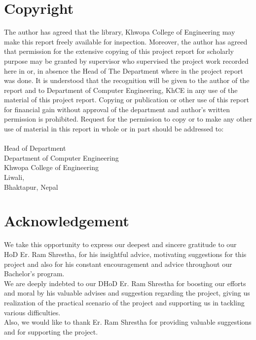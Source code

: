 			\chapter*{Copyright}
		\normalsize
			The author has agreed that the library, Khwopa College of Engineering  may make this report freely available for inspection. Moreover, the author has agreed that permission for the extensive copying of this project report for scholarly purpose may be granted by supervisor who supervised the project work recorded here in or, in absence the Head of The Department where in the project report was done. It is understood that the recognition will be given to the author of the report and to Department of Computer Engineering, KhCE in any use of the material of this project report. Copying or publication or other use of this report for financial gain without approval of the department and author’s written permission is prohibited. Request for the permission to copy or to make any other use of material in this report in whole or in part should be addressed to: \\
			\vspace{1cm} \\
			Head of Department \\
			Department of Computer Engineering\\
			Khwopa College of Engineering\\
			Liwali,\\
			Bhaktapur, Nepal\\
		\break

	
		\large
			\chapter*{Acknowledgement}
		\normalsize
			We take this opportunity to express our deepest and sincere gratitude to our HoD Er. Ram Shrestha, for his insightful advice, motivating suggestions for this project and also for his constant encouragement and advice throughout our Bachelor’s program.
			\\We are deeply indebted to our DHoD Er. Ram Shrestha for boosting our efforts and moral by his valuable advises and suggestion regarding the project, giving us realization of the practical scenario of the project and supporting us in tackling various difficulties.\\Also, we would like to thank Er. Ram Shrestha for providing valuable suggestions and for supporting the project.
			\vspace{1cm}


